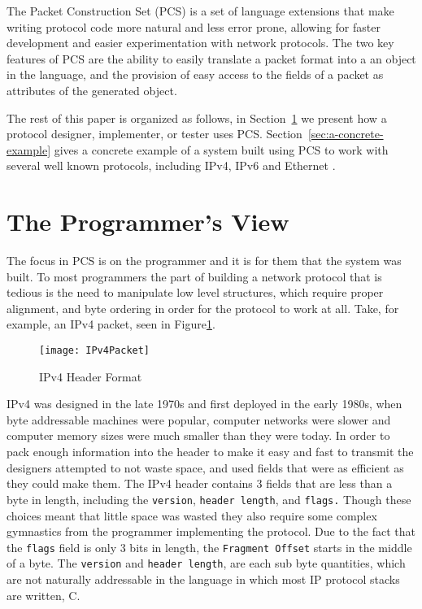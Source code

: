 \documentclass{sig-alternate-10pt}
\begin{document}
The Packet Construction Set (PCS) is a set of language extensions that
make writing protocol code more natural and less error prone, allowing
for faster development and easier experimentation with network
protocols.  The two key features of PCS are the ability to easily
translate a packet format into a an object in the language, and the
provision of easy access to the fields of a packet as attributes of
the generated object.

The rest of this paper is organized as follows, in
Section~\ref{sec:the-programmers-view} we present how a protocol
designer, implementer, or tester uses PCS.
Section~\ref{sec:a-concrete-example} gives a concrete example of a
system built using PCS to work with several well known protocols,
including IPv4\cite{postel:rfc791}, IPv6\cite{deering:rfc2460} and
Ethernet \cite{metcalf:ethernet}.

\section{The Programmer's View}
\label{sec:the-programmers-view}

The focus in PCS is on the programmer and it is for them that the
system was built.  To most programmers the part of building a network
protocol that is tedious is the need to manipulate low level
structures, which require proper alignment, and byte ordering in order
for the protocol to work at all.  Take, for example, an IPv4 packet,
seen in Figure\ref{fig:rfc791-ipheader}.

\begin{figure}
  \centering
\label{fig:rfc791-ipheader}
\texttt{[image: IPv4Packet]}
  \caption{IPv4 Header Format}
\end{figure}

IPv4 was designed in the late 1970s and first deployed in the early
1980s, when byte addressable machines were popular, computer networks
were slower and computer memory sizes were much smaller than they were
today.  In order to pack enough information into the header to make it
easy and fast to transmit the designers attempted to not waste space,
and used fields that were as efficient as they could make them.  The
IPv4 header contains 3 fields that are less than a byte in length,
including the \verb|version|, \verb|header length|, and \verb|flags.|
Though these choices meant that little space was wasted they also
require some complex gymnastics from the programmer implementing the
protocol.  Due to the fact that the \verb|flags| field is only 3 bits
in length, the \verb|Fragment Offset| starts in the middle of a
byte.  The \verb|version| and \verb|header length|, are each sub byte
quantities, which are not naturally addressable in the language in
which most IP protocol stacks are written, C.
\end{document}

